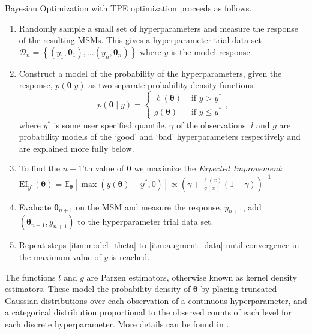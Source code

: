 \documentclass[journal=jacsat,manuscript=article]{achemso}
\begin{document}
Bayesian Optimization with TPE optimization proceeds as follows. 
\begin{enumerate}
    \item Randomly sample a small set of hyperparameters and measure the response of the resulting MSMs. This gives a hyperparameter trial data set $\mathcal{D}_{n}=\left\{(y_1, \bm{\theta}_1),  \ldots (y_n, \bm{\theta}_n) \right \}$ where $y$ is the model response.
    \item Construct a model of the probability of the hyperparameters, given the response, $p(\bm{\theta}|y)$ as two separate probability density functions: 
    \begin{equation}
        p(\bm{\theta} \mid y)= \begin{cases}\ell(\bm{\theta}) & \text { if } y>y^* \\ g(\bm{\theta}) & \text { if } y \leq y^*\end{cases}, 
    \end{equation}
    where $y^{*}$ is some user specified quantile, $\gamma$ of the observations.  $l$ and $g$ are probability models of the `good' and `bad' hyperparameters respectively and are explained more fully below. \label{itm:model_theta} 
    \item To find the $n+1$'th value of $\bm{\theta}$ we maximize the \emph{Expected Improvement}: $\mathrm{EI}_{y^{*}}(\bm{\theta}) = \mathbb{E}_{\bm{\theta}}\left[\max{(y(\bm{\theta})-y^{*}, 0)} \right ]\propto\left(\gamma+\frac{\ell(x)}{g(x)}(1-\gamma)\right)^{-1}$
    \item Evaluate $\bm{\theta}_{n+1}$ on the MSM and measure the response, $y_{n+1}$, add $\left( \bm{\theta}_{n+1}, y_{n+1}\right)$ to the hyperparameter trial data set. \label{itm:augment_data}
    \item Repeat steps \ref{itm:model_theta} to \ref{itm:augment_data} until convergence in the maximum value of $y$ is reached.   
    
\end{enumerate}

The functions $l$ and $g$ are Parzen estimators, otherwise known as kernel density estimators. These model the probability density of $\bm{\theta}$ by placing truncated Gaussian distributions over each observation of a continuous hyperparameter, and a categorical distribution proportional to the observed counts of each level for each discrete hyperparameter. More details can be found in \cite{bergstraAlgorithmsHyperParameterOptimizationa, bergstraMakingScienceModel2013}. 
\end{document}
